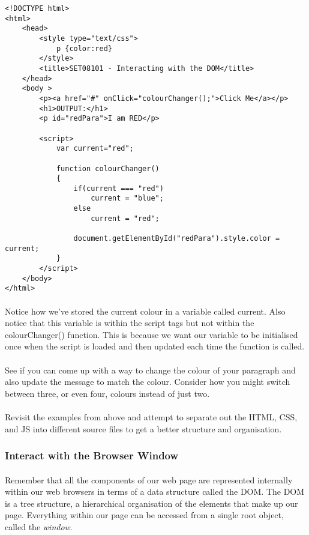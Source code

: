 \documentclass[10pt, a4paper]{article}
\begin{document}
\begin{lstlisting}
<!DOCTYPE html>
<html>
    <head>
        <style type="text/css">
            p {color:red}
        </style>
        <title>SET08101 - Interacting with the DOM</title>
    </head>
    <body >
        <p><a href="#" onClick="colourChanger();">Click Me</a></p>
        <h1>OUTPUT:</h1>
        <p id="redPara">I am RED</p>

        <script>
            var current="red";
            
            function colourChanger() 
            { 
                if(current === "red")
                    current = "blue";
                else
                    current = "red";

                document.getElementById("redPara").style.color = current;
            }      
        </script>
    </body>
</html>
\end{lstlisting}

\paragraph{} Notice how we've stored the current colour in a variable called current. Also notice that this variable is within the script tags but not within the colourChanger() function. This is because we want our variable to be initialised once when the script is loaded and then updated each time the function is called.

\paragraph{} See if you can come up with a way to change the colour of your paragraph and also update the message to match the colour. Consider how you might switch between three, or even four, colours instead of just two.

\paragraph{} Revisit the examples from above and attempt to separate out the HTML, CSS, and JS into different source files to get a better structure and organisation.

\subsubsection{Interact with the Browser Window}
\paragraph{} Remember that all the components of our web page are represented internally within our web browsers in terms of a data structure called the DOM. The DOM is a tree structure, a hierarchical organisation of the elements that make up our page. Everything within our page can be accessed from a single root object, called the \emph{window}.
\end{document}
